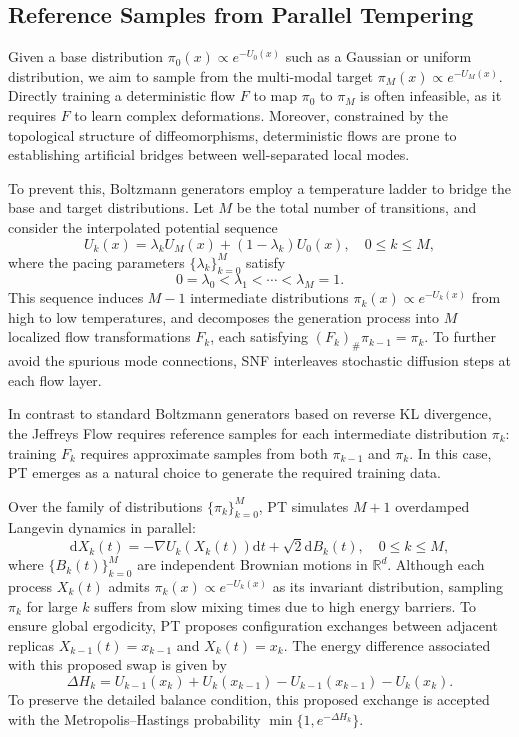 \documentclass[%
 reprint,
 amsmath,amssymb,
 aps,
 pre,
]{revtex4-2}
\newcommand{\D}{\mathrm{d}}
\newcommand{\Le}{\leqslant}
\begin{document}
\subsection{Reference Samples from Parallel Tempering}

Given a base distribution $\pi_0(x) \propto e^{-U_0(x)}$ such as a Gaussian or uniform distribution, we aim to sample from the multi-modal target $\pi_M(x) \propto e^{-U_M(x)}$. Directly training a deterministic flow $F$ to map $\pi_0$ to $\pi_M$ is often infeasible, as it requires $F$ to learn complex deformations. Moreover, constrained by the topological structure of diffeomorphisms, deterministic flows are prone to establishing artificial bridges between well-separated local modes.

To prevent this, Boltzmann generators \cite{noe2019boltzmann} employ a temperature ladder to bridge the base and target distributions. Let $M$ be the total number of transitions, and consider the interpolated potential sequence
\begin{equation}
	U_k(x) = \lambda_k U_M(x) + (1-\lambda_k) U_0(x), \quad 0\Le k\Le M,
\end{equation}
where the pacing parameters $\{\lambda_k\}_{k=0}^M$ satisfy
\begin{equation*}
	0 = \lambda_0 < \lambda_1 < \cdots < \lambda_M = 1.
\end{equation*}
This sequence induces $M-1$ intermediate distributions $\pi_k(x) \propto e^{-U_k(x)}$ from high to low temperatures, and decomposes the generation process into $M$ localized flow transformations $F_k$, each satisfying $(F_k)_\# \pi_{k-1} = \pi_k$. To further avoid the spurious mode connections, SNF \cite{wu2020stochastic} interleaves stochastic diffusion steps at each flow layer.

In contrast to standard Boltzmann generators based on reverse KL divergence, the Jeffreys Flow requires reference samples for each intermediate distribution $\pi_k$: training $F_k$ requires approximate samples from both $\pi_{k-1}$ and $\pi_k$. In this case, PT \cite{syed2022non} emerges as a natural choice to generate the required training data.

Over the family of distributions $\{\pi_k\}_{k=0}^M$, PT simulates $M+1$ overdamped Langevin dynamics in parallel:
\begin{equation*}
	\D X_k(t) = -\nabla U_k(X_k(t))\D t + \sqrt{2}\D B_k(t),
	\quad 0\Le k\Le M,
\end{equation*}
where $\{B_k(t)\}_{k=0}^M$ are independent Brownian motions in $\mathbb R^d$. 
Although each process $X_k(t)$ admits $\pi_k(x) \propto e^{-U_k(x)}$ as its invariant distribution,
sampling $\pi_k$ for large $k$ suffers from slow mixing times due to high energy barriers.
To ensure global ergodicity, PT proposes configuration exchanges between adjacent replicas $X_{k-1}(t) = x_{k-1}$ and $X_k(t) = x_k$. The energy difference associated with this proposed swap is given by
\begin{equation*}
	\Delta H_k = U_{k-1}(x_k) + U_k(x_{k-1}) - U_{k-1}(x_{k-1}) - U_k(x_k).
\end{equation*}
To preserve the detailed balance condition, this proposed exchange is accepted with the Metropolis--Hastings probability $\min\{1, e^{-\Delta H_k}\}$.
\end{document}
